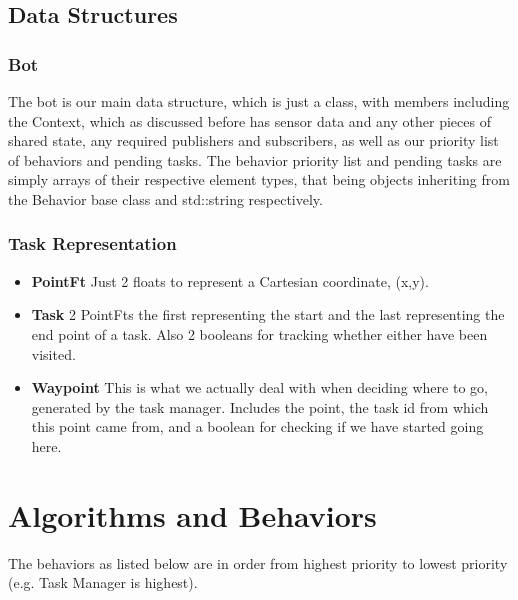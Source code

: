 \documentclass[12pt]{article}
\begin{document}
\subsection{Data Structures}

\subsubsection{Bot}
The bot is our main data structure, which is just a class, with members including the Context, which as discussed before has sensor data and any other pieces of shared state, any required publishers and subscribers, as well as our priority list of behaviors and pending tasks. The behavior priority list and pending tasks are simply arrays of their respective element types, that being objects inheriting from the Behavior base class and std::string respectively.

\subsubsection{Task Representation}
\begin{itemize}
    \item \textbf{PointFt} Just 2 floats to represent a Cartesian coordinate, (x,y).
    \item \textbf{Task} 2 PointFts the first representing the start and the last representing the end point of a task. Also 2 booleans for tracking whether either have been visited.
    \item \textbf{Waypoint} This is what we actually deal with when deciding where to go, generated by the task manager. Includes the point, the task id from which this point came from, and a boolean for checking if we have started going here.
\end{itemize}

\section{Algorithms and Behaviors}

The behaviors as listed below are in order from highest priority to lowest priority (e.g. Task Manager is highest).
\end{document}
